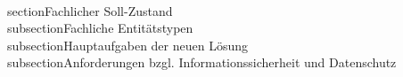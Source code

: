 \\section{Fachlicher Soll-Zustand} %
\label{sec:fachlicher_soll_zustand}
\\subsection{Fachliche Entitätstypen}
\\subsection{Hauptaufgaben der neuen Lösung}
\\subsection{Anforderungen bzgl. Informationssicherheit und Datenschutz}

